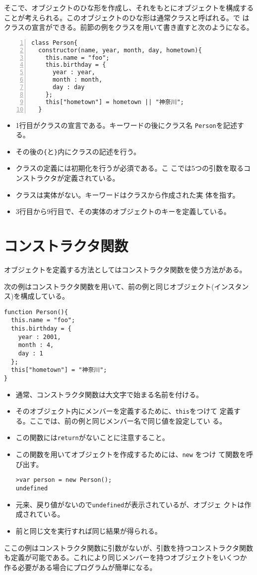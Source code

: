 そこで、オブジェクトのひな形を作成し、それをもとにオブジェクトを構成する
ことが考えられる。このオブジェクトのひな形は通常クラスと呼ばれる。\ES で
はクラスの宣言ができる。前節の例をクラスを用いて書き直すと次のようになる。
\begin{Verbatim}[numbers=left]
class Person{
  constructor(name, year, month, day, hometown){
    this.name = "foo";
    this.birthday = {
      year : year,
      month : month,
      day : day
    };
    this["hometown"] = hometown || "神奈川";
  }
\end{Verbatim}
\begin{itemize}
 \item 1行目がクラスの宣言である。キーワードの後にクラス名
       \texttt{Person}を記述する。
 \item その後の\Verb+{+と\Verb+}+内にクラスの記述を行う。
 \item クラスの定義には初期化を行うが必須である。こ
       こでは5つの引数を取るコンストラクタが定義されている。
 \item クラスは実体がない。キーワードはクラスから作成された実
       体を指す。
 \item 3行目から9行目で、その実体のオブジェクトのキーを定義している。
\end{itemize}
\iffalse
\section{コンストラクタ関数}
オブジェクトを定義する方法としてはコンストラクタ関数を使う方法がある。
\begin{Exec}\label{constructor}\upshape
次の例はコンストラクタ関数を用いて、前の例と同じオブジェクト(インスタン
 ス)を構成している。
\begin{Verbatim}
function Person(){
  this.name = "foo";
  this.birthday = {
    year : 2001,
    month : 4,
    day : 1
  };
  this["hometown"] = "神奈川";
}
\end{Verbatim}
\begin{itemize}
 \item 通常、コンストラクタ関数は大文字で始まる名前を付ける。
 \item そのオブジェクト内にメンバーを定義するために、\verb+this+をつけて
       定義する。ここでは、前の例と同じメンバー名で同じ値を設定してい
       る。
 \item この関数には\verb+return+がないことに注意すること。
 \item この関数を用いてオブジェクトを作成するためには、\verb+new+ をつけ
       て関数を呼び出す。
\begin{Verbatim}
>var person = new Person();
undefined
\end{Verbatim}
 \item 元来、戻り値がないので\verb+undefined+が表示されているが、オブジェ
       クトは作成されている。
 \item 前と同じ文を実行すれば同じ結果が得られる。
\end{itemize}
\end{Exec}
ここの例はコンストラクタ関数に引数がないが、引数を持つコンストラクタ関数
 も定義が可能である。これにより同じメンバーを持つオブジェクトをいくつか
 作る必要がある場合にプログラムが簡単になる。

